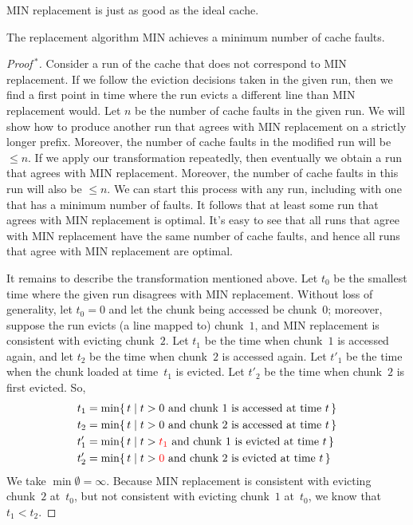 MIN replacement is just as good as the ideal cache.
\begin{theorem}[{Belady~1966}]\label{th:min-is-best}
The replacement algorithm MIN achieves a minimum number of cache faults.
\end{theorem}
\begin{proof}[Proof$\,{}^\ast$]
Consider a run of the cache that does not correspond to MIN replacement.
If we follow the eviction decisions taken in the given run,
  then we find a first point in time where the run evicts a different line
    than MIN replacement would.
Let $n$ be the number of cache faults in the given run.
We will show how to produce another run that agrees with MIN replacement
  on a strictly longer prefix.
Moreover, the number of cache faults in the modified run will be $\le n$.
If we apply our transformation repeatedly,
  then eventually we obtain a run that agrees with MIN replacement.
Moreover, the number of cache faults in this run will also be $\le n$.
We can start this process with any run,
  including with one that has a minimum number of faults.
It follows that at least some run that agrees with MIN replacement is optimal.
It's easy to see that all runs that agree with MIN replacement have the same
  number of cache faults,
  and hence all runs that agree with MIN replacement are optimal.

It remains to describe the transformation mentioned above.
Let $t_0$ be the smallest time where the given run disagrees with MIN replacement.
Without loss of generality,
  let $t_0=0$ and let the chunk being accessed be chunk~$0$;
  moreover, suppose the run evicts (a line mapped to) chunk~$1$,
  and MIN replacement is consistent with evicting chunk~$2$.
Let $t_1$ be the time when chunk~$1$ is accessed again,
  and let $t_2$ be the time when chunk~$2$ is accessed again.
Let $t'_1$ be the time when the chunk loaded at time~$t_1$ is evicted.
Let $t'_2$ be the time when chunk~$2$ is first evicted.
So,
\begin{align*}
  t_1 & = \min\{\,t\mid\text{$t>0$ and chunk~$1$ is accessed at time~$t$}\,\} \\
  t_2 & = \min\{\,t\mid\text{$t>0$ and chunk~$2$ is accessed at time~$t$}\,\} \\
  t'_1 &= \min\{\,t\mid\text{$t>{\color{red} t_1}$ and chunk~$1$ is evicted at time~$t$}\,\} \\
  t'_2 &= \min\{\,t\mid\text{$t>{\color{red} 0}$ and chunk~$2$ is evicted at time~$t$}\,\}
\end{align*}
We take $\min\emptyset=\infty$.
Because MIN replacement is consistent with evicting chunk~$2$ at~$t_0$,
  but not consistent with evicting chunk~$1$ at~$t_0$,
  we know that $t_1<t_2$.


\end{proof}
